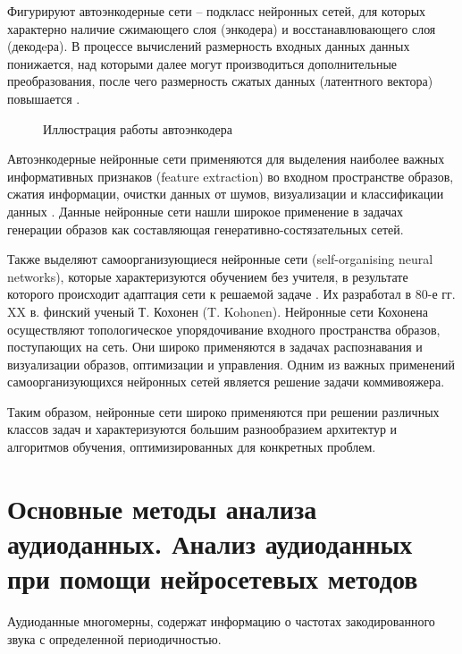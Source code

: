 Фигурируют автоэнкодерные сети -- подкласс нейронных сетей, для которых характерно наличие сжимающего слоя (энкодера) и восстанавлювающего слоя (декодeра).
В процессе вычислений размерность входных данных данных понижается, над которыми далее могут производиться дополнительные преобразования, 
после чего размерность сжатых данных (латентного вектора) повышается \cite{vae}.
\begin{figure}[H]
	\caption{Иллюстрация работы автоэнкодера}
\end{figure}

Автоэнкодерные нейронные сети применяются для выделения наиболее важных информативных признаков 
(feature extraction) во входном пространстве образов, сжатия информации, очистки
данных от шумов, визуализации и классификации данных \cite{bgu_krasn}.
Данные нейронные сети нашли широкое применение в задачах генерации образов как составляющая генеративно-состязательных сетей.

Также выделяют самоорганизующиеся нейронные сети (self-organising neural networks), которые характеризуются обучением без учителя, в результате которого происходит адаптация сети к решаемой задаче . Их разработал в 80-е гг. XX в.
финский ученый Т. Кохонен (T. Kohonen). Нейронные сети
Кохонена осуществляют топологическое упорядочивание входного
пространства образов, поступающих на сеть. Они широко применяются
в задачах распознавания и визуализации образов, оптимизации и
управления. Одним из важных применений самоорганизующихся нейронных сетей является решение задачи коммивояжера.

Таким образом, нейронные сети широко применяются при решении различных классов задач и характеризуются
большим разнообразием архитектур и алгоритмов обучения, оптимизированных для конкретных проблем.

\section{Основные методы анализа аудиоданных. Анализ аудиоданных при помощи нейросетевых методов}
Аудиоданные многомерны, содержат информацию о частотах закодированного звука с 
определенной периодичностью. 

